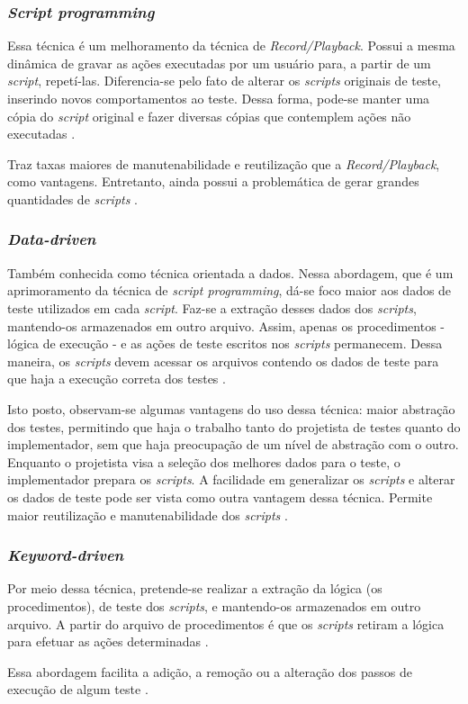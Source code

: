 \subsubsection{\textit{Script programming}}
Essa técnica é um melhoramento da técnica de \textit{Record/Playback}. Possui a mesma dinâmica de gravar as ações executadas por um usuário para, a partir de um \textit{script}, repetí-las. Diferencia-se pelo fato de alterar os \textit{scripts} originais de teste, inserindo novos comportamentos ao teste. Dessa forma, pode-se manter uma cópia do \textit{script} original e fazer diversas cópias que contemplem ações não executadas \cite{kent2007}.
\par
\indent Traz taxas maiores de manutenabilidade e reutilização que a \textit{Record/Playback}, como vantagens. Entretanto, ainda possui a problemática de gerar grandes quantidades de \textit{scripts} \cite{fantinatoEtAl2004}.
\subsubsection{\textit{Data-driven}}
Também conhecida como técnica orientada a dados. Nessa abordagem, que é um aprimoramento da técnica de \textit{script programming}, dá-se foco maior aos dados de teste utilizados em cada \textit{script}. Faz-se a extração desses dados dos \textit{scripts}, mantendo-os armazenados em outro arquivo. Assim,  apenas os procedimentos - lógica de execução - e as ações de teste escritos nos \textit{scripts} permanecem. Dessa maneira, os \textit{scripts} devem acessar os arquivos contendo os dados de teste para que haja a execução correta dos testes \cite{kent2007}.
\par
\indent Isto posto, observam-se algumas vantagens do uso dessa técnica: maior abstração dos testes, permitindo que haja o trabalho tanto do projetista de testes quanto do implementador, sem que haja preocupação de um nível de abstração com o outro. Enquanto o projetista visa a seleção dos melhores dados para o teste, o implementador prepara os \textit{scripts}. A facilidade em generalizar os \textit{scripts} e alterar os dados de teste pode ser vista como outra vantagem dessa técnica. Permite maior reutilização e manutenabilidade dos \textit{scripts} \cite{fantinatoEtAl2004}.
\subsubsection{\textit{Keyword-driven}}
Por meio dessa técnica, pretende-se realizar a extração da lógica (os procedimentos), de teste dos \textit{scripts}, e mantendo-os armazenados em outro arquivo. A partir do arquivo de procedimentos é que os \textit{scripts} retiram a lógica para efetuar as ações determinadas \cite{kent2007}.
\par
\indent Essa abordagem facilita a adição, a remoção ou a alteração dos passos de execução de algum teste \cite{fantinatoEtAl2004}.
